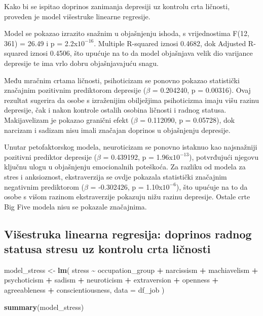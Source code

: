 \documentclass[
]{article}
\newenvironment{Shaded}{\begin{snugshade}}{\end{snugshade}}
\newcommand{\AttributeTok}[1]{\textcolor[rgb]{0.13,0.29,0.53}{#1}}
\newcommand{\FunctionTok}[1]{\textcolor[rgb]{0.13,0.29,0.53}{\textbf{#1}}}
\newcommand{\NormalTok}[1]{#1}
\newcommand{\OtherTok}[1]{\textcolor[rgb]{0.56,0.35,0.01}{#1}}
\newcommand{\SpecialCharTok}[1]{\textcolor[rgb]{0.81,0.36,0.00}{\textbf{#1}}}
\begin{document}
Kako bi se ispitao doprinos zanimanja depresiji uz kontrolu crta
ličnosti, proveden je model višestruke linearne regresije.

Model se pokazao izrazito snažnim u objašnjenju ishoda, s vrijednostima
F(12, 361) = 26.49 i p = 2.2x\(10^{-16}\). Multiple R-squared iznosi
0.4682, dok Adjusted R-squared iznosi 0.4506, što upućuje na to da model
objašnjava velik dio varijance depresije te ima vrlo dobru
objašnjavajuću snagu.

Među mračnim crtama ličnosti, psihoticizam se ponovno pokazao
statistički značajnim pozitivnim prediktorom depresije (\(\beta\) =
0.204240, p = 0.00316). Ovaj rezultat sugerira da osobe s izraženijim
obilježjima psihoticizma imaju višu razinu depresije, čak i nakon
kontrole ostalih osobina ličnosti i radnog statusa. Makijavelizam je
pokazao granični efekt (\(\beta\) = 0.112090, p = 0.05728), dok narcizam
i sadizam nisu imali značajan doprinos u objašnjenju depresije.

Unutar petofaktorskog modela, neuroticizam se ponovno istaknuo kao
najsnažniji pozitivni prediktor depresije (\(\beta\) = 0.439192, p =
1.96x\(10^{-13}\)), potvrđujući njegovu ključnu ulogu u objašnjenju
emocionalnih poteškoća. Za razliku od modela za stres i anksioznost,
ekstraverzija se ovdje pokazala statistički značajnim negativnim
prediktorom (\(\beta\) = -0.302426, p = 1.10x\(10^{-6}\)), što upućuje
na to da osobe s višom razinom ekstraverzije pokazuju nižu razinu
depresije. Ostale crte Big Five modela nisu se pokazale značajnima.

\subsection{Višestruka linearna regresija: doprinos radnog statusa
stresu uz kontrolu crta
ličnosti}\label{viux161estruka-linearna-regresija-doprinos-radnog-statusa-stresu-uz-kontrolu-crta-liux10dnosti}

\begin{Shaded}
\begin{Highlighting}[]
\NormalTok{model\_stress }\OtherTok{\textless{}{-}} \FunctionTok{lm}\NormalTok{(}
\NormalTok{  stress }\SpecialCharTok{\textasciitilde{}}\NormalTok{ occupation\_group }\SpecialCharTok{+} 
\NormalTok{  narcissism }\SpecialCharTok{+}\NormalTok{ machiavelism }\SpecialCharTok{+}\NormalTok{ psychoticism }\SpecialCharTok{+}\NormalTok{ sadism }\SpecialCharTok{+}\NormalTok{ neuroticism }\SpecialCharTok{+}
\NormalTok{  extraversion }\SpecialCharTok{+}\NormalTok{ openness }\SpecialCharTok{+}\NormalTok{ agreeableness }\SpecialCharTok{+}\NormalTok{ conscientiousness,}
  \AttributeTok{data =}\NormalTok{ df\_job}
\NormalTok{)}

\FunctionTok{summary}\NormalTok{(model\_stress)}
\end{Highlighting}
\end{Shaded}
\end{document}
